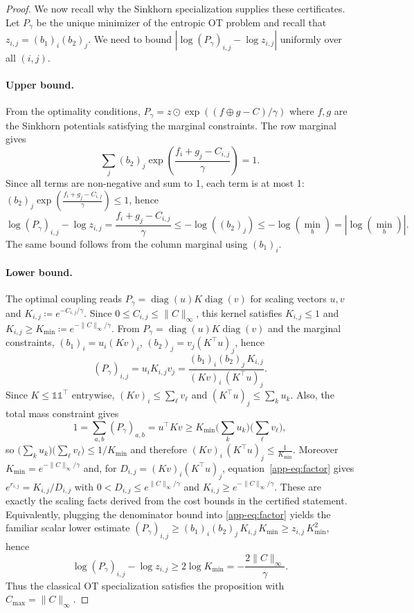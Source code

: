 \documentclass{article}
\theoremstyle{plain}
\newcommand{\ones}{\mathds{1}}
\DeclareMathOperator{\diag}{diag}
\newcommand{\z}{z}
\begin{document}
\begin{proof}
We now recall why the Sinkhorn specialization supplies these certificates.  Let
$P_\gamma$ be the unique minimizer of the entropic OT problem and recall that
$\z_{i,j} = (b_1)_i(b_2)_j$.  We need to bound
$|\log(P_\gamma)_{i,j} - \log \z_{i,j}|$ uniformly over all $(i,j)$.

\paragraph{Upper bound.}
From the optimality conditions, $P_\gamma = \z \odot \exp((f \oplus g - C)/\gamma)$ where $f,g$ are the Sinkhorn potentials satisfying the marginal constraints. The row marginal gives
\[
\sum_j (b_2)_j \exp\left(\frac{f_i + g_j - C_{i,j}}{\gamma}\right) = 1.
\]
Since all terms are non-negative and sum to 1, each term is at most 1:
$(b_2)_j \exp\left(\frac{f_i + g_j - C_{i,j}}{\gamma}\right) \le 1$,
hence
\[
\log(P_\gamma)_{i,j} - \log \z_{i,j} = \frac{f_i + g_j - C_{i,j}}{\gamma}
\le -\log((b_2)_j) \le -\log(\min_b)=|\log(\min_b)|.
\]
The same bound follows from the column marginal using $(b_1)_i$.

\paragraph{Lower bound.}
The optimal coupling reads $P_\gamma=\diag(u) K \diag(v)$ for scaling vectors $u,v$ and $K_{i,j}  \coloneqq  e^{-C_{i,j}/\gamma}$.
Since \(0\le C_{i,j}\le\|C\|_\infty\), this kernel satisfies
\(K_{i,j}\le1\) and \(K_{i,j}\ge K_{\min}\coloneqq e^{-\|C\|_\infty/\gamma}\).
From $P_\gamma=\diag(u)K\diag(v)$ and the marginal constraints,
$(b_1)_i=u_i(Kv)_i$, $(b_2)_j=v_j(K^\top u)_j$,
hence
\begin{equation}\label{app-eq:factor}
(P_\gamma)_{i,j}
=u_iK_{i,j}v_j
=\frac{(b_1)_i(b_2)_j\,K_{i,j}}{(Kv)_i\,(K^\top u)_j}.
\end{equation}
Since $K\le \ones\ones^\top$ entrywise, $(Kv)_i\le \sum_\ell v_\ell$ and $(K^\top u)_j\le \sum_k u_k$.
Also, the total mass constraint gives
\[
1=\sum_{a,b}(P_\gamma)_{a,b}=u^\top Kv \ge K_{\min}\Big(\sum_k u_k\Big)\Big(\sum_\ell v_\ell\Big),
\]
so $\big(\sum_k u_k\big)\big(\sum_\ell v_\ell\big)\le 1/K_{\min}$ and therefore
$
(Kv)_i\,(K^\top u)_j \le \frac{1}{K_{\min}}.
$
Moreover $K_{\min}=e^{-\|C\|_\infty/\gamma}$ and, for
$D_{i,j}=(Kv)_i(K^\top u)_j$, equation~\eqref{app-eq:factor} gives
$e^{r_{i,j}}=K_{i,j}/D_{i,j}$ with
$0<D_{i,j}\le e^{\|C\|_\infty/\gamma}$ and
$K_{i,j}\ge e^{-\|C\|_\infty/\gamma}$.  These are exactly the scaling
facts derived from the cost bounds in the certified statement.  Equivalently, plugging the
denominator bound into \eqref{app-eq:factor} yields the familiar scalar lower
estimate
$(P_\gamma)_{i,j}\ge (b_1)_i(b_2)_j\,K_{i,j}\,K_{\min} \ge \z_{i,j}\,K_{\min}^2$,
hence
\[
\log(P_\gamma)_{i,j} - \log \z_{i,j} \ge 2\log K_{\min} = -\frac{2\|C\|_\infty}{\gamma}.
\]
Thus the classical OT specialization satisfies the proposition with
$C_{\max}=\|C\|_\infty$.
\end{proof}
\end{document}
